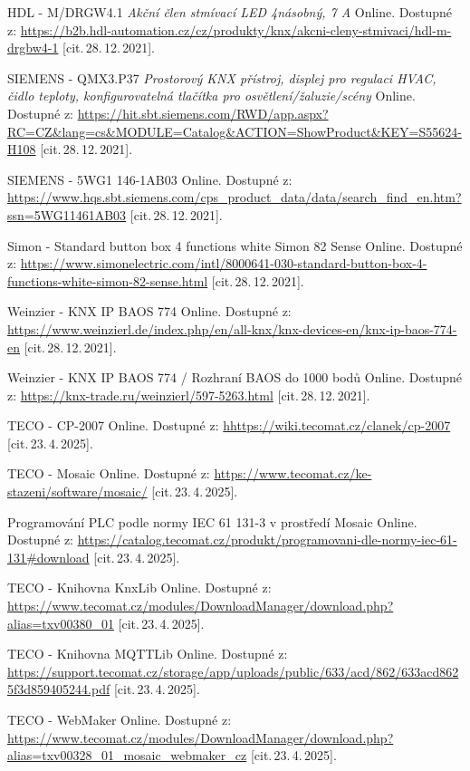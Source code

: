 \begin{thebibliography}{99}
        HDL - M/DRGW4.1 \textit{Akční člen stmívací LED 4násobný, 7 A}\/ Online. 
		Dostupné z:
    \url{https://b2b.hdl-automation.cz/cz/produkty/knx/akcni-cleny-stmivaci/hdl-m-drgbw4-1}
		[cit.\,28.\,12.\,2021].
    
		SIEMENS - QMX3.P37 \textit{Prostorový KNX přístroj, displej pro regulaci HVAC, čidlo teploty, konfigurovatelná tlačítka pro osvětlení/žaluzie/scény}\/ Online. 
		Dostupné z:
    \url{https://hit.sbt.siemens.com/RWD/app.aspx?RC=CZ&lang=cs&MODULE=Catalog&ACTION=ShowProduct&KEY=S55624-H108}
		[cit.\,28.\,12.\,2021].
    
		SIEMENS - 5WG1 146-1AB03 \/ Online. 
		Dostupné z:
    \url{https://www.hqs.sbt.siemens.com/cps_product_data/data/search_find_en.htm?ssn=5WG11461AB03}
		[cit.\,28.\,12.\,2021].  
    
		Simon - Standard button box 4 functions white Simon 82 Sense\/ Online. 
		Dostupné z:
    \url{https://www.simonelectric.com/intl/8000641-030-standard-button-box-4-functions-white-simon-82-sense.html}
		[cit.\,28.\,12.\,2021].

		Weinzier - KNX IP BAOS 774\/ Online. 
		Dostupné z:
    \url{https://www.weinzierl.de/index.php/en/all-knx/knx-devices-en/knx-ip-baos-774-en}
		[cit.\,28.\,12.\,2021].
    
		Weinzier - KNX IP BAOS 774 / Rozhraní BAOS do 1000 bodů\/ Online. 
		Dostupné z:
    \url{https://knx-trade.ru/weinzierl/597-5263.html}
		[cit.\,28.\,12.\,2021].

		TECO - CP-2007\/ Online. 
		Dostupné z:
	\url{hhttps://wiki.tecomat.cz/clanek/cp-2007}
		[cit.\,23.\,4.\,2025].

		TECO - Mosaic\/ Online. 
		Dostupné z:
	\url{https://www.tecomat.cz/ke-stazeni/software/mosaic/}
		[cit.\,23.\,4.\,2025].

		Programování PLC podle normy IEC 61 131-3 v prostředí Mosaic\/ Online. 
		Dostupné z:
	\url{https://catalog.tecomat.cz/produkt/programovani-dle-normy-iec-61-131#download}
		[cit.\,23.\,4.\,2025].

		TECO - Knihovna KnxLib\/ Online. 
		Dostupné z:
	\url{https://www.tecomat.cz/modules/DownloadManager/download.php?alias=txv00380_01}
		[cit.\,23.\,4.\,2025].

		TECO - Knihovna MQTTLib\/ Online. 
		Dostupné z:
	\url{https://support.tecomat.cz/storage/app/uploads/public/633/acd/862/633acd8625f3d859405244.pdf}
		[cit.\,23.\,4.\,2025].

		TECO - WebMaker\/ Online. 
		Dostupné z:
	\url{https://www.tecomat.cz/modules/DownloadManager/download.php?alias=txv00328_01_mosaic_webmaker_cz}
		[cit.\,23.\,4.\,2025].

\end{thebibliography} 
